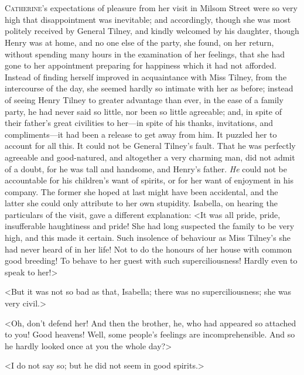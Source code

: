 \chapter[Chapter \thechapter]{} 

 \lettrine{C}{atherine}'s expectations of pleasure from her visit in Milsom Street were so very high that disappointment was inevitable; and accordingly, though she was most politely received by General Tilney, and kindly welcomed by his daughter, though Henry was at home, and no one else of the party, she found, on her return, without spending many hours in the examination of her feelings, that she had gone to her appointment preparing for happiness which it had not afforded. Instead of finding herself improved in acquaintance with Miss Tilney, from the intercourse of the day, she seemed hardly so intimate with her as before; instead of seeing Henry Tilney to greater advantage than ever, in the ease of a family party, he had never said so little, nor been so little agreeable; and, in spite of their father's great civilities to her—in spite of his thanks, invitations, and compliments—it had been a release to get away from him. It puzzled her to account for all this. It could not be General Tilney's fault. That he was perfectly agreeable and good-natured, and altogether a very charming man, did not admit of a doubt, for he was tall and handsome, and Henry's father. \textit{He} could not be accountable for his children's want of spirits, or for her want of enjoyment in his company. The former she hoped at last might have been accidental, and the latter she could only attribute to her own stupidity. Isabella, on hearing the particulars of the visit, gave a different explanation: <It was all pride, pride, insufferable haughtiness and pride! She had long suspected the family to be very high, and this made it certain. Such insolence of behaviour as Miss Tilney's she had never heard of in her life! Not to do the honours of her house with common good breeding! To behave to her guest with such superciliousness! Hardly even to speak to her!> 

 <But it was not so bad as that, Isabella; there was no superciliousness; she was very civil.> 

 <Oh, don't defend her! And then the brother, he, who had appeared so attached to you! Good heavens! Well, some people's feelings are incomprehensible. And so he hardly looked once at you the whole day?> 

 <I do not say so; but he did not seem in good spirits.> 

